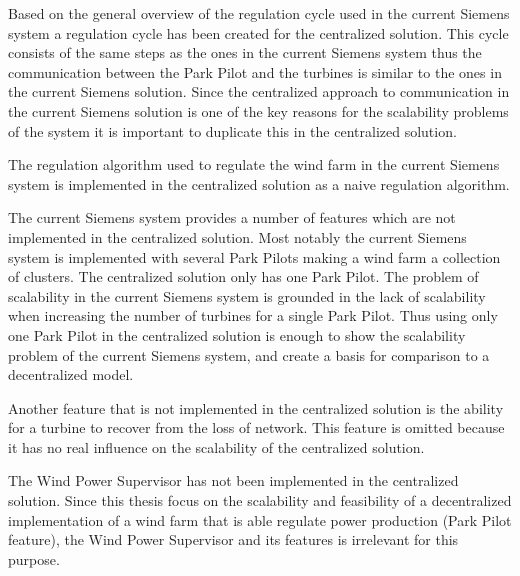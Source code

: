 Based on the general overview of the regulation cycle used in the current Siemens system a regulation cycle has been created for the centralized solution. This cycle consists of the same steps as the ones in the current Siemens system thus the communication between the Park Pilot and the turbines is similar to the ones in the current Siemens solution. Since the centralized approach to communication in the current Siemens solution is one of the key reasons for the scalability problems of the system it is important to duplicate this in the centralized solution.

The regulation algorithm used to regulate the wind farm in the current Siemens system is implemented in the centralized solution as a naive regulation algorithm.

The current Siemens system provides a number of features which are not implemented in the centralized solution. Most notably the current Siemens system is implemented with several Park Pilots making a wind farm a collection of clusters. The centralized solution only has one Park Pilot. The problem of scalability in the current Siemens system is grounded in the lack of scalability when increasing the number of turbines for a single Park Pilot. Thus using only one Park Pilot in the centralized solution is enough to show the scalability problem of the current Siemens system, and create a basis for comparison to a decentralized model.

Another feature that is not implemented in the centralized solution is the ability for a turbine to recover from the loss of network. This feature is omitted because it has no real influence on the scalability of the centralized solution.

The Wind Power Supervisor has not been implemented in the centralized solution. Since this thesis focus on the scalability and feasibility of a decentralized implementation of a wind farm that is able regulate power production (Park Pilot feature), the Wind Power Supervisor and its features is irrelevant for this purpose.